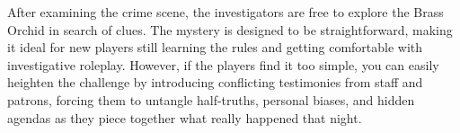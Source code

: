 After examining the crime scene, the investigators are free to explore the Brass Orchid in search of clues. The mystery is designed to be straightforward, making it ideal for new players still learning the rules and getting comfortable with investigative roleplay. However, if the players find it too simple, you can easily heighten the challenge by introducing conflicting testimonies from staff and patrons, forcing them to untangle half-truths, personal biases, and hidden agendas as they piece together what really happened that night.

